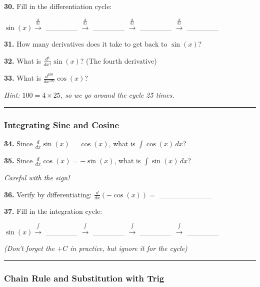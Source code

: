 \documentclass[
  11pt,
]{article}
\begin{document}
\textbf{30.} Fill in the differentiation cycle:

\(\sin(x) \xrightarrow{\frac{d}{dx}}\) \_\_\_\_\_\_
\(\xrightarrow{\frac{d}{dx}}\) \_\_\_\_\_\_
\(\xrightarrow{\frac{d}{dx}}\) \_\_\_\_\_\_
\(\xrightarrow{\frac{d}{dx}}\) \_\_\_\_\_\_

\textbf{31.} How many derivatives does it take to get back to
\(\sin(x)\)?

\textbf{32.} What is \(\frac{d^4}{dx^4}\sin(x)\)? (The fourth
derivative)

\textbf{33.} What is \(\frac{d^{100}}{dx^{100}}\cos(x)\)?

\emph{Hint: \(100 = 4 \times 25\), so we go around the cycle 25 times.}

\begin{center}\rule{0.5\linewidth}{0.5pt}\end{center}

\hypertarget{integrating-sine-and-cosine}{%
\subsubsection{Integrating Sine and
Cosine}\label{integrating-sine-and-cosine}}

\textbf{34.} Since \(\frac{d}{dx}\sin(x) = \cos(x)\), what is
\(\int \cos(x) \, dx\)?

\textbf{35.} Since \(\frac{d}{dx}\cos(x) = -\sin(x)\), what is
\(\int \sin(x) \, dx\)?

\emph{Careful with the sign!}

\textbf{36.} Verify by differentiating: \(\frac{d}{dx}(-\cos(x)) ={}\)
\_\_\_\_\_\_\_\_\_\_

\textbf{37.} Fill in the integration cycle:

\(\sin(x) \xrightarrow{\int}\) \_\_\_\_\_\_ \(\xrightarrow{\int}\)
\_\_\_\_\_\_ \(\xrightarrow{\int}\) \_\_\_\_\_\_ \(\xrightarrow{\int}\)
\_\_\_\_\_\_

\emph{(Don't forget the \(+C\) in practice, but ignore it for the
cycle)}

\begin{center}\rule{0.5\linewidth}{0.5pt}\end{center}

\hypertarget{chain-rule-and-substitution-with-trig}{%
\subsubsection{Chain Rule and Substitution with
Trig}\label{chain-rule-and-substitution-with-trig}}
\end{document}
